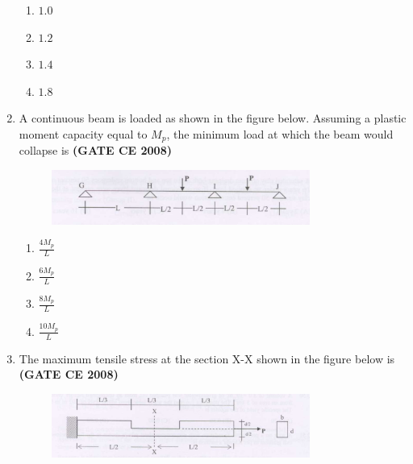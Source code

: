 \documentclass[journal]{IEEEtran}
\begin{document}
\begin{enumerate}
\begin{enumerate}
\item $1.0$
\item $1.2$
\item $1.4$
\item $1.8$
\end{enumerate}

\item A continuous beam is loaded as shown in the figure below. Assuming a plastic moment capacity equal to $M_p$, the minimum load at which the beam would collapse is \textbf{(GATE CE 2008)}

\begin{figure}[h]
    \centering
    \includegraphics[width=0.8\textwidth]{figs/fig1.png} 

\end{figure}
\begin{multicols}{2}

\begin{enumerate}
\item $\frac{4M_p}{L}$
\vspace{0.1cm}
\item $\frac{6M_p}{L}$
\item $\frac{8M_p}{L}$
\vspace{0.1cm}
\item $\frac{10M_p}{L}$
\end{enumerate}     
\end{multicols}

\item The maximum tensile stress at the section X-X shown in the figure below is \textbf{(GATE CE 2008)}

\begin{figure}[h]
    \centering
    \includegraphics[width=0.8\textwidth]{figs/fig2.png} 

\end{figure}
\begin{multicols}{2}


\end{multicols}
\end{enumerate}
\end{document}
